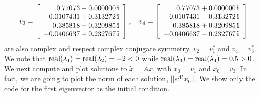 $$v_3 = \left[
\begin{array}{r}
    0.77073-0.000000 \mathop{\bm{\mathrm i}} \\
 -0.0107431+0.313272 \mathop{\bm{\mathrm i}} \\
   0.385818-0.320985 \mathop{\bm{\mathrm i}}  \\
 -0.0406637+0.232767 \mathop{\bm{\mathrm i}} 
\end{array}
\right], \quad v_4 = 
\left[
\begin{array}{r}
   0.77073+0.000000 \mathop{\bm{\mathrm i}} \\
 -0.0107431-0.313272 \mathop{\bm{\mathrm i}} \\
   0.385818+0.320985 \mathop{\bm{\mathrm i}} \\
 -0.0406637-0.232767 \mathop{\bm{\mathrm i}} \\
\end{array}
\right]
$$
are also complex and respect complex conjugate symmetry, $v_2 = v_1^\ast$ and $v_4 = v_3^\ast$. \\

We note that ${\rm real}(\lambda_1) = {\rm real}(\lambda_2) =-2< 0$ while ${\rm real}(\lambda_3) = {\rm real}(\lambda_4) =0.5 > 0$. We next compute and plot solutions to $\dot{x}=Ax$, with $x_0 = v_1$ and $x_0 = v_3$. In fact, we are going to plot the norm of each solution, $||e^{At} x_0||$. We show only the code for the first eigenvector as the initial condition.

